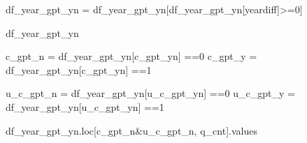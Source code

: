 \documentclass[
  letterpaper,
  DIV=11,
  numbers=noendperiod]{scrartcl}
\newenvironment{Shaded}{\begin{snugshade}}{\end{snugshade}}
\newcommand{\DecValTok}[1]{\textcolor[rgb]{0.68,0.00,0.00}{#1}}
\newcommand{\NormalTok}[1]{\textcolor[rgb]{0.00,0.23,0.31}{#1}}
\newcommand{\OperatorTok}[1]{\textcolor[rgb]{0.37,0.37,0.37}{#1}}
\newcommand{\StringTok}[1]{\textcolor[rgb]{0.13,0.47,0.30}{#1}}
\begin{document}
\begin{Shaded}
\begin{Highlighting}[]
\NormalTok{df\_year\_gpt\_yn }\OperatorTok{=}\NormalTok{ df\_year\_gpt\_yn[df\_year\_gpt\_yn[}\StringTok{\textquotesingle{}yeardiff\textquotesingle{}}\NormalTok{]}\OperatorTok{\textgreater{}=}\DecValTok{0}\NormalTok{]}
\end{Highlighting}
\end{Shaded}

\begin{Shaded}
\begin{Highlighting}[]
\NormalTok{df\_year\_gpt\_yn}
\end{Highlighting}
\end{Shaded}

\begin{Shaded}
\begin{Highlighting}[]
\NormalTok{c\_gpt\_n }\OperatorTok{=}\NormalTok{ df\_year\_gpt\_yn[}\StringTok{\textquotesingle{}c\_gpt\_yn\textquotesingle{}}\NormalTok{] }\OperatorTok{==}\DecValTok{0}
\NormalTok{c\_gpt\_y }\OperatorTok{=}\NormalTok{ df\_year\_gpt\_yn[}\StringTok{\textquotesingle{}c\_gpt\_yn\textquotesingle{}}\NormalTok{] }\OperatorTok{==}\DecValTok{1} 

\NormalTok{u\_c\_gpt\_n }\OperatorTok{=}\NormalTok{ df\_year\_gpt\_yn[}\StringTok{\textquotesingle{}u\_c\_gpt\_yn\textquotesingle{}}\NormalTok{] }\OperatorTok{==}\DecValTok{0}
\NormalTok{u\_c\_gpt\_y }\OperatorTok{=}\NormalTok{ df\_year\_gpt\_yn[}\StringTok{\textquotesingle{}u\_c\_gpt\_yn\textquotesingle{}}\NormalTok{] }\OperatorTok{==}\DecValTok{1} 
\end{Highlighting}
\end{Shaded}

\begin{Shaded}
\begin{Highlighting}[]
\NormalTok{df\_year\_gpt\_yn.loc[c\_gpt\_n}\OperatorTok{\&}\NormalTok{u\_c\_gpt\_n, }\StringTok{\textquotesingle{}q\_cnt\textquotesingle{}}\NormalTok{].values}
\end{Highlighting}
\end{Shaded}
\end{document}
